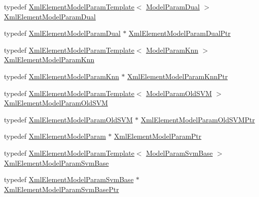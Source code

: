 \begin{DoxyCompactItemize}
\item 
typedef \hyperlink{class_k_k_m_l_l_1_1_xml_element_model_param_template}{Xml\+Element\+Model\+Param\+Template}$<$ \hyperlink{class_k_k_m_l_l_1_1_model_param_dual}{Model\+Param\+Dual} $>$ \hyperlink{namespace_k_k_m_l_l_a2cb7719542d14dbf06bd95dda1cf6001}{Xml\+Element\+Model\+Param\+Dual}
\item 
typedef \hyperlink{namespace_k_k_m_l_l_a2cb7719542d14dbf06bd95dda1cf6001}{Xml\+Element\+Model\+Param\+Dual} $\ast$ \hyperlink{namespace_k_k_m_l_l_ab568fdebc9ddf8cf2e4bb6c613a31576}{Xml\+Element\+Model\+Param\+Dual\+Ptr}
\item 
typedef \hyperlink{class_k_k_m_l_l_1_1_xml_element_model_param_template}{Xml\+Element\+Model\+Param\+Template}$<$ \hyperlink{class_k_k_m_l_l_1_1_model_param_knn}{Model\+Param\+Knn} $>$ \hyperlink{namespace_k_k_m_l_l_af998b0f3ec84644bcd076fc2a31a8ec2}{Xml\+Element\+Model\+Param\+Knn}
\item 
typedef \hyperlink{namespace_k_k_m_l_l_af998b0f3ec84644bcd076fc2a31a8ec2}{Xml\+Element\+Model\+Param\+Knn} $\ast$ \hyperlink{namespace_k_k_m_l_l_a107846416eabb4c4f99a1f63b291f367}{Xml\+Element\+Model\+Param\+Knn\+Ptr}
\item 
typedef \hyperlink{class_k_k_m_l_l_1_1_xml_element_model_param_template}{Xml\+Element\+Model\+Param\+Template}$<$ \hyperlink{class_k_k_m_l_l_1_1_model_param_old_s_v_m}{Model\+Param\+Old\+S\+VM} $>$ \hyperlink{namespace_k_k_m_l_l_aa81ee09a95a692b407b4c03eb374d91a}{Xml\+Element\+Model\+Param\+Old\+S\+VM}
\item 
typedef \hyperlink{namespace_k_k_m_l_l_aa81ee09a95a692b407b4c03eb374d91a}{Xml\+Element\+Model\+Param\+Old\+S\+VM} $\ast$ \hyperlink{namespace_k_k_m_l_l_a526fc030c3e8b75edc1ebe096c20de27}{Xml\+Element\+Model\+Param\+Old\+S\+V\+M\+Ptr}
\item 
typedef \hyperlink{class_k_k_m_l_l_1_1_xml_element_model_param}{Xml\+Element\+Model\+Param} $\ast$ \hyperlink{namespace_k_k_m_l_l_aad346863c8f91e413a619896455b3822}{Xml\+Element\+Model\+Param\+Ptr}
\item 
typedef \hyperlink{class_k_k_m_l_l_1_1_xml_element_model_param_template}{Xml\+Element\+Model\+Param\+Template}$<$ \hyperlink{class_k_k_m_l_l_1_1_model_param_svm_base}{Model\+Param\+Svm\+Base} $>$ \hyperlink{namespace_k_k_m_l_l_a5aa2879f7b12d90cde7a7431299004ea}{Xml\+Element\+Model\+Param\+Svm\+Base}
\item 
typedef \hyperlink{namespace_k_k_m_l_l_a5aa2879f7b12d90cde7a7431299004ea}{Xml\+Element\+Model\+Param\+Svm\+Base} $\ast$ \hyperlink{namespace_k_k_m_l_l_a78eea0d0790543ab28f80cde082eb357}{Xml\+Element\+Model\+Param\+Svm\+Base\+Ptr}

\end{DoxyCompactItemize}
